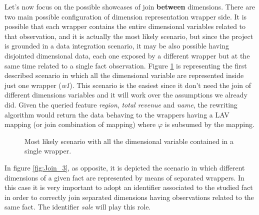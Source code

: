 \documentclass[12pt,a4paper]{report}
\newcommand\globalQuery{\varphi}
\begin{document}
Let's now focus on the possible showcases of join \textbf{between} dimensions.
%
There are two main possible configuration of dimension representation wrapper side.
%
It is possible that each wrapper contains the entire  dimensional variables related to that observation, and it is actually the most likely scenario, but since the project is grounded in a data integration scenario, it may be also possible having disjointed dimensional data, each one exposed by a different wrapper but at the same time related to a single fact observation.
%
Figure \ref{fig:Join_2} is representing the first described scenario in which all the dimensional variable are represented inside just one wrapper (\textit{w1}).
%
This scenario is the easiest since it don't need the join of different dimensions variables and it will work over the assumptions we already did.
%
Given the queried feature \textit{region}, \textit{total revenue} and \textit{name}, the rewriting algorithm would return the data behaving to the wrappers having a LAV mapping (or join combination of mapping) where $\globalQuery$ is subsumed by the mapping.
%
\begin{figure} [ht]
    \caption{Most likely scenario with all the dimensional variable contained in a single wrapper.}
    \label{fig:Join_2}
\end{figure}
%
In figure \ref{fig:Join_3}, as opposite, it is depicted the scenario in which different dimensions of a given fact are represented by means of separated wrappers.
%
In this case it is very important to adopt an identifier associated to the studied fact in order to correctly join separated dimensions having observations related to the same fact.
%
The identifier \textit{sale} will play this role.
%
\end{document}
